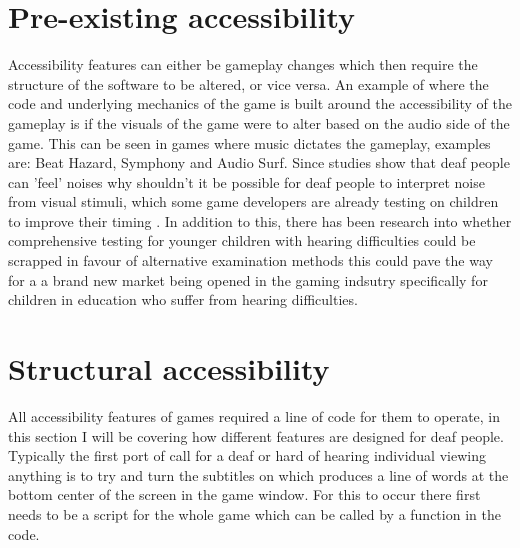 \documentclass{scrartcl}
\begin{document}
\section{Pre-existing accessibility}
Accessibility features can either be gameplay changes which then require the structure of the software to be altered, or vice versa. An example of where the code and underlying mechanics of the game is built around the accessibility of the gameplay is if the visuals of the game were to alter based on the audio side of the game. This can be seen in games where music dictates the gameplay, examples are: Beat Hazard, Symphony and Audio Surf. Since studies show that deaf people can 'feel' noises \cite {Nanayakkara} why shouldn't it be possible for deaf people to interpret noise from visual stimuli, which some game developers are already testing on children to improve their timing  \cite {Jouhtimak}. In addition to this, there has been research into whether comprehensive testing for younger children with hearing difficulties could be scrapped in favour of alternative examination methods \cite {Mich} this could pave the way for a a brand new market being opened in the gaming indsutry specifically for children in education who suffer from hearing difficulties.

\section{Structural accessibility}
All accessibility features of games required a line of code for them to operate, in this section I will be covering how different features are designed for deaf people.
Typically the first port of call for a deaf or hard of hearing individual viewing anything is to try and turn the subtitles on which produces a line of words at the bottom center of the screen in the game window. For this to occur there first needs to be a script for the whole game which can be called by a function in the code.



\end{document}

